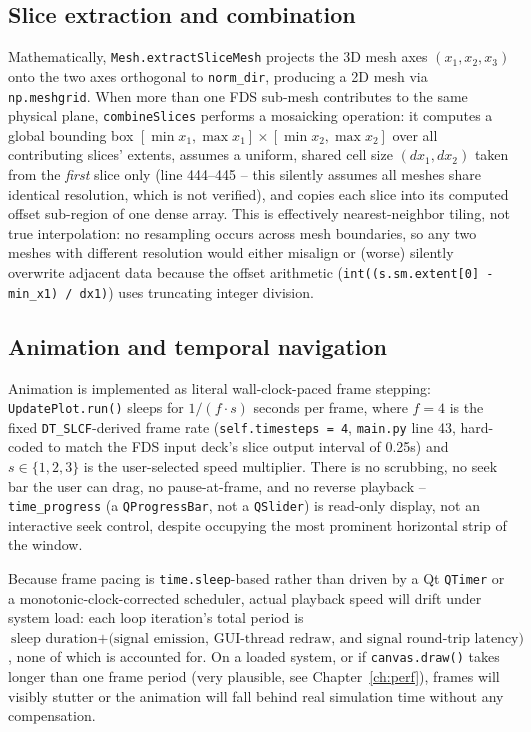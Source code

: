 \documentclass[11pt,a4paper]{report}
\begin{document}
\subsection{Slice extraction and combination}
Mathematically, \texttt{Mesh.extractSliceMesh} projects the 3D mesh axes $(x_1,x_2,x_3)$ onto the two
axes orthogonal to \texttt{norm\_dir}, producing a 2D mesh via \texttt{np.meshgrid}. When more than one
FDS sub-mesh contributes to the same physical plane, \texttt{combineSlices} performs a mosaicking
operation: it computes a global bounding box
$[\min x_1, \max x_1] \times [\min x_2, \max x_2]$ over all contributing slices' extents, assumes a
uniform, shared cell size $(dx_1, dx_2)$ taken from the \emph{first} slice only (line 444--445 --
this silently assumes all meshes share identical resolution, which is not verified), and copies each
slice into its computed offset sub-region of one dense array. This is effectively nearest-neighbor
tiling, not true interpolation: no resampling occurs across mesh boundaries, so any two meshes with
different resolution would either misalign or (worse) silently overwrite adjacent data because the
offset arithmetic (\texttt{int((s.sm.extent[0] - min\_x1) / dx1)}) uses truncating integer division.

\subsection{Animation and temporal navigation}
\begin{factbox}
Animation is implemented as literal wall-clock-paced frame stepping: \texttt{UpdatePlot.run()}
sleeps for $1/(f \cdot s)$ seconds per frame, where $f{=}4$ is the fixed \texttt{DT\_SLCF}-derived
frame rate (\texttt{self.timesteps = 4}, \texttt{main.py} line 43, hard-coded to match the FDS input
deck's slice output interval of 0.25s) and $s \in \{1,2,3\}$ is the user-selected speed multiplier.
There is no scrubbing, no seek bar the user can drag, no pause-at-frame, and no reverse playback --
\texttt{time\_progress} (a \texttt{QProgressBar}, not a \texttt{QSlider}) is read-only display, not an
interactive seek control, despite occupying the most prominent horizontal strip of the window.
\end{factbox}

\begin{interpbox}
Because frame pacing is \texttt{time.sleep}-based rather than driven by a Qt \texttt{QTimer} or a
monotonic-clock-corrected scheduler, actual playback speed will drift under system load: each loop
iteration's total period is $\text{sleep duration} + \text{(signal emission, GUI-thread redraw, and
signal round-trip latency)}$, none of which is accounted for. On a loaded system, or if
\texttt{canvas.draw()} takes longer than one frame period (very plausible, see
Chapter~\ref{ch:perf}), frames will visibly stutter or the animation will fall behind real simulation
time without any compensation.
\end{interpbox}
\end{document}
